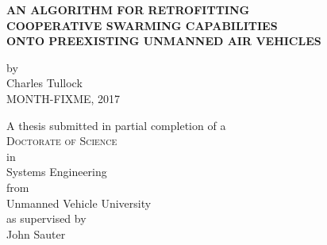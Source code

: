 \begin{titlepage}
	\begin{center}

		\vspace*{1cm}
		 
		
		\large{ \textbf{ \uppercase{An algorithm for retrofitting\\cooperative swarming capabilities\\onto preexisting unmanned air vehicles\\}}}
		
		\vspace{1.5cm}
		
		by\\
		Charles Tullock\\
		MONTH-FIXME, 2017
		
		\vspace{3cm}
		
		A thesis submitted in partial completion of a\\
		\large{\textsc{Doctorate of Science}}\\ 
		in\\
		\large{Systems Engineering}\\
		from\\
		\large{Unmanned Vehicle University}\\
		as supervised by\\
		\large{John Sauter}
		\vfill

	\end{center}
\thispagestyle{empty}
\end{titlepage}

